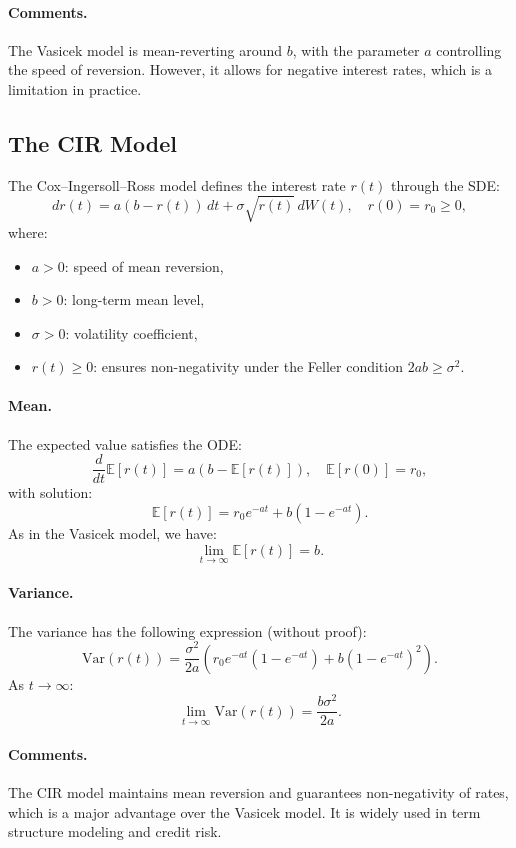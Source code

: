 \paragraph{Comments.}
The Vasicek model is mean-reverting around \( b \), with the parameter \( a \) controlling the speed of reversion. However, it allows for negative interest rates, which is a limitation in practice.

\subsection{The CIR Model}

The Cox–Ingersoll–Ross model defines the interest rate \( r(t) \) through the SDE:
\[
dr(t) = a(b - r(t))\,dt + \sigma \sqrt{r(t)}\, dW(t), \quad r(0) = r_0 \geq 0,
\]
where:
\begin{itemize}
    \item \( a > 0 \): speed of mean reversion,
    \item \( b > 0 \): long-term mean level,
    \item \( \sigma > 0 \): volatility coefficient,
    \item \( r(t) \geq 0 \): ensures non-negativity under the Feller condition \( 2ab \geq \sigma^2 \).
\end{itemize}

\paragraph{Mean.}
The expected value satisfies the ODE:
\[
\frac{d}{dt} \mathbb{E}[r(t)] = a(b - \mathbb{E}[r(t)]), \quad \mathbb{E}[r(0)] = r_0,
\]
with solution:
\[
\mathbb{E}[r(t)] = r_0 e^{-a t} + b(1 - e^{-a t}).
\]
As in the Vasicek model, we have:
\[
\lim_{t \to \infty} \mathbb{E}[r(t)] = b.
\]

\paragraph{Variance.}
The variance has the following expression (without proof):
\[
\text{Var}(r(t)) = \frac{\sigma^2}{2a} \left( r_0 e^{-a t} (1 - e^{-a t}) + b(1 - e^{-a t})^2 \right).
\]
As \( t \to \infty \):
\[
\lim_{t \to \infty} \text{Var}(r(t)) = \frac{b\sigma^2}{2a}.
\]

\paragraph{Comments.}
The CIR model maintains mean reversion and guarantees non-negativity of rates, which is a major advantage over the Vasicek model. It is widely used in term structure modeling and credit risk.

